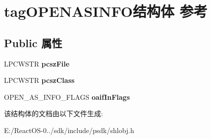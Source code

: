 \hypertarget{structtag_o_p_e_n_a_s_i_n_f_o}{}\section{tag\+O\+P\+E\+N\+A\+S\+I\+N\+F\+O结构体 参考}
\label{structtag_o_p_e_n_a_s_i_n_f_o}
\subsection*{Public 属性}
\begin{DoxyCompactItemize}
\item 
\mbox{\label{structtag_o_p_e_n_a_s_i_n_f_o_a1e0810c971991420b6ca688f3ffaf778}} 
L\+P\+C\+W\+S\+TR {\bfseries pcsz\+File}
\item 
\mbox{\label{structtag_o_p_e_n_a_s_i_n_f_o_a9485606cd883ace6c5376a64d1910f80}} 
L\+P\+C\+W\+S\+TR {\bfseries pcsz\+Class}
\item 
\mbox{\label{structtag_o_p_e_n_a_s_i_n_f_o_ad2b532d7f616cea13311f9aa9d66660d}} 
O\+P\+E\+N\+\_\+\+A\+S\+\_\+\+I\+N\+F\+O\+\_\+\+F\+L\+A\+GS {\bfseries oaif\+In\+Flags}
\end{DoxyCompactItemize}


该结构体的文档由以下文件生成\+:\begin{DoxyCompactItemize}
\item 
E\+:/\+React\+O\+S-\/0../sdk/include/psdk/shlobj.\+h\end{DoxyCompactItemize}

